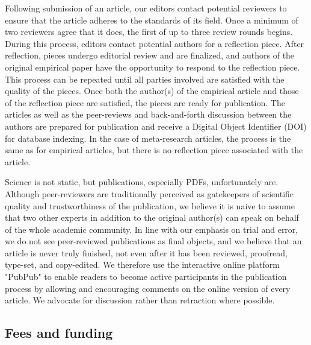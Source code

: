 \documentclass[twocolumn, serif, editorial, authordate]{jote-article}
\begin{document}
Following submission of an article, our editors contact potential reviewers to ensure that the article adheres to the standards of its field. Once a minimum of two reviewers agree that it does, the first of up to three review rounds begins. During this process, editors contact potential authors for a reflection piece. After reflection, pieces undergo editorial review and are finalized, and authors of the original empirical paper have the opportunity to respond to the reflection piece. This process can be repeated until all parties involved are satisfied with the quality of the pieces. Once both the author(s) of the empirical article and those of the reflection piece are satisfied, the pieces are ready for publication. The articles as well as the peer-reviews and back-and-forth discussion between the authors are prepared for publication and receive a Digital Object Identifier (DOI) for database indexing. In the case of meta-research articles, the process is the same as for empirical articles, but there is no reflection piece associated with the article.

Science is not static, but publications, especially PDFs, unfortunately are. Although peer-reviewers are traditionally perceived as gatekeepers of scientific quality and trustworthiness of the publication, we believe it is naive to assume that two other experts in addition to the original author(s) can speak on behalf of the whole academic community. In line with our emphasis on trial and error, we do not see peer-reviewed publications as final objects, and we believe that an article is never truly finished, not even after it has been reviewed, proofread, type-set, and copy-edited. We therefore use the interactive online platform "PubPub" to enable readers to become active participants in the publication process by allowing and encouraging comments on the online version of every article. We advocate for discussion rather than retraction where possible.


 {}\subsection*{Fees and funding}
\end{document}
